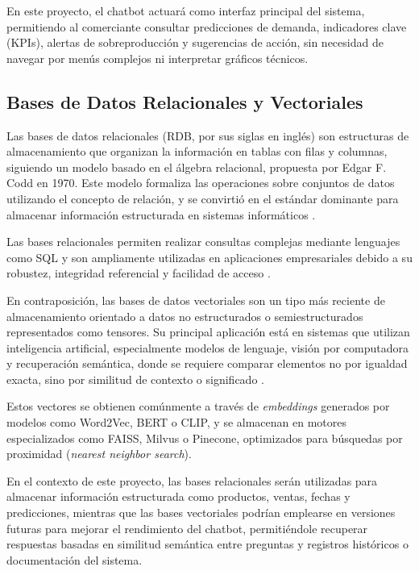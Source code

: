 En este proyecto, el chatbot actuará como interfaz principal del sistema, permitiendo al comerciante consultar predicciones de demanda, indicadores clave (KPIs), alertas de sobreproducción y sugerencias de acción, sin necesidad de navegar por menús complejos ni interpretar gráficos técnicos.

\subsection{Bases de Datos Relacionales y Vectoriales}

Las bases de datos relacionales (RDB, por sus siglas en inglés) son estructuras de almacenamiento que organizan la información en tablas con filas y columnas, siguiendo un modelo basado en el álgebra relacional, propuesta por Edgar F. Codd en 1970. Este modelo formaliza las operaciones sobre conjuntos de datos utilizando el concepto de relación, y se convirtió en el estándar dominante para almacenar información estructurada en sistemas informáticos \parencite{codd1970}. 

Las bases relacionales permiten realizar consultas complejas mediante lenguajes como SQL y son ampliamente utilizadas en aplicaciones empresariales debido a su robustez, integridad referencial y facilidad de acceso \parencite{coronel2020}.

En contraposición, las bases de datos vectoriales son un tipo más reciente de almacenamiento orientado a datos no estructurados o semiestructurados representados como tensores. Su principal aplicación está en sistemas que utilizan inteligencia artificial, especialmente modelos de lenguaje, visión por computadora y recuperación semántica, donde se requiere comparar elementos no por igualdad exacta, sino por similitud de contexto o significado \parencite{johnson2019}.

Estos vectores se obtienen comúnmente a través de \textit{embeddings} generados por modelos como Word2Vec, BERT o CLIP, y se almacenan en motores especializados como FAISS, Milvus o Pinecone, optimizados para búsquedas por proximidad (\textit{nearest neighbor search}).

En el contexto de este proyecto, las bases relacionales serán utilizadas para almacenar información estructurada como productos, ventas, fechas y predicciones, mientras que las bases vectoriales podrían emplearse en versiones futuras para mejorar el rendimiento del chatbot, permitiéndole recuperar respuestas basadas en similitud semántica entre preguntas y registros históricos o documentación del sistema.

